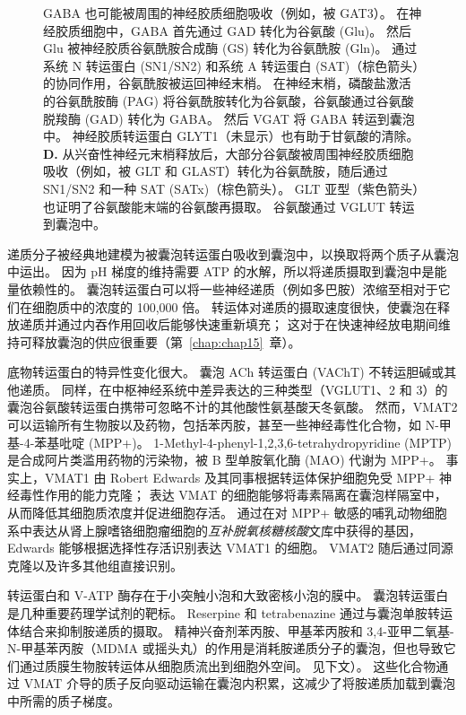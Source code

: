 \begin{figure}[htbp]
{		GABA 也可能被周围的神经胶质细胞吸收（例如，被 GAT3）。
		在神经胶质细胞中，GABA 首先通过 GAD 转化为谷氨酸 (Glu)。 然后 Glu 被神经胶质谷氨酰胺合成酶 (GS) 转化为谷氨酰胺 (Gln)。
		通过系统 N 转运蛋白 (SN1/SN2) 和系统 A 转运蛋白 (SAT)（棕色箭头）的协同作用，谷氨酰胺被运回神经末梢。
		在神经末梢，磷酸盐激活的谷氨酰胺酶 (PAG) 将谷氨酰胺转化为谷氨酸，谷氨酸通过谷氨酸脱羧酶 (GAD) 转化为 GABA。
		然后 VGAT 将 GABA 转运到囊泡中。
		神经胶质转运蛋白 GLYT1（未显示）也有助于甘氨酸的清除。
		\textbf{D.} 从兴奋性神经元末梢释放后，大部分谷氨酸被周围神经胶质细胞吸收（例如，被 GLT 和 GLAST）转化为谷氨酰胺，随后通过 SN1/SN2 和一种 SAT (SATx)（棕色箭头）。
		GLT 亚型（紫色箭头）也证明了谷氨酸能末端的谷氨酸再摄取。 谷氨酸通过 VGLUT 转运到囊泡中。}
	\label{fig:16_1}
\end{figure}


递质分子被经典地建模为被囊泡转运蛋白吸收到囊泡中，以换取将两个质子从囊泡中运出。
因为 pH 梯度的维持需要 ATP 的水解，所以将递质摄取到囊泡中是能量依赖性的。
囊泡转运蛋白可以将一些神经递质（例如多巴胺）浓缩至相对于它们在细胞质中的浓度的 100,000 倍。
转运体对递质的摄取速度很快，使囊泡在释放递质并通过内吞作用回收后能够快速重新填充；
这对于在快速神经放电期间维持可释放囊泡的供应很重要（第~\ref{chap:chap15}~章）。


底物转运蛋白的特异性变化很大。
囊泡 ACh 转运蛋白 (VAChT) 不转运胆碱或其他递质。
同样，在中枢神经系统中差异表达的三种类型（VGLUT1、2 和 3）的囊泡谷氨酸转运蛋白携带可忽略不计的其他酸性氨基酸天冬氨酸。
然而，VMAT2 可以运输所有生物胺以及药物，包括苯丙胺，甚至一些神经毒性化合物，如 N-甲基-4-苯基吡啶 (MPP+)。
1-Methyl-4-phenyl-1,2,3,6-tetrahydropyridine (MPTP) 是合成阿片类滥用药物的污染物，被 B 型单胺氧化酶 (MAO) 代谢为 MPP+。
事实上，VMAT1 由 Robert Edwards 及其同事根据转运体保护细胞免受 MPP+ 神经毒性作用的能力克隆； 表达 VMAT 的细胞能够将毒素隔离在囊泡样隔室中，从而降低其细胞质浓度并促进细胞存活。
通过在对 MPP+ 敏感的哺乳动物细胞系中表达从肾上腺嗜铬细胞瘤细胞的\textit{互补脱氧核糖核酸}文库中获得的基因，Edwards 能够根据选择性存活识别表达 VMAT1 的细胞。
VMAT2 随后通过同源克隆以及许多其他组直接识别。


转运蛋白和 V-ATP 酶存在于小突触小泡和大致密核小泡的膜中。
囊泡转运蛋白是几种重要药理学试剂的靶标。 Reserpine 和 tetrabenazine 通过与囊泡单胺转运体结合来抑制胺递质的摄取。
精神兴奋剂苯丙胺、甲基苯丙胺和 3,4-亚甲二氧基-N-甲基苯丙胺（MDMA 或摇头丸）的作用是消耗胺递质分子的囊泡，但也导致它们通过质膜生物胺转运体从细胞质流出到细胞外空间。 见下文）。
这些化合物通过 VMAT 介导的质子反向驱动运输在囊泡内积累，这减少了将胺递质加载到囊泡中所需的质子梯度。


